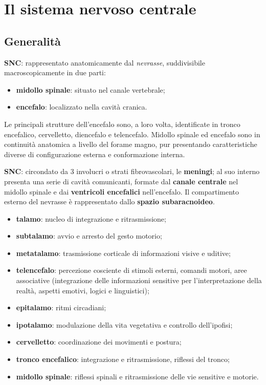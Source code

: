 \chapter{Il sistema nervoso centrale}

\section{Generalità}

\textbf{SNC}: rappresentato anatomicamente dal \textit{nevrasse}, suddivisibile
macroscopicamente in due parti:
\begin{itemize}
  \item \textbf{midollo spinale}: situato nel canale vertebrale;
  \item \textbf{encefalo}: localizzato nella cavità cranica.
\end{itemize}

Le principali strutture dell'encefalo sono, a loro volta, identificate in
tronco encefalico, cervelletto, diencefalo e telencefalo. Midollo spinale ed
encefalo sono in continuità anatomica a livello del forame magno, pur
presentando caratteristiche diverse di configurazione esterna e conformazione
interna.

\textbf{SNC}: circondato da 3 involucri o strati fibrovascolari, le
\textbf{meningi}; al suo interno presenta una serie di cavità comunicanti,
formate dal \textbf{canale centrale} nel midollo spinale e dai
\textbf{ventricoli encefalici} nell'encefalo. Il compartimento esterno del
nevrasse è rappresentato dallo \textbf{spazio subaracnoideo}.

\begin{itemize}
  \item \textbf{talamo}: nucleo di integrazione e ritrasmissione;
  \item \textbf{subtalamo}: avvio e arresto del gesto motorio;
  \item \textbf{metatalamo}: trasmissione corticale di informazioni visive e
    uditive;
  \item \textbf{telencefalo}: percezione cosciente di stimoli esterni,
    comandi motori, aree associative (integrazione delle informazioni
    sensitive per l'interpretazione della realtà, aspetti emotivi, logici e
    linguistici);
  \item \textbf{epitalamo}: ritmi circadiani;
  \item \textbf{ipotalamo}: modulazione della vita vegetativa e controllo
    dell'ipofisi;
  \item \textbf{cervelletto}: coordinazione dei movimenti e postura;
  \item \textbf{tronco encefalico}: integrazione e ritrasmissione, riflessi
    del tronco;
  \item \textbf{midollo spinale}: riflessi spinali e ritrasmissione delle
    vie sensitive e motorie.
\end{itemize}

